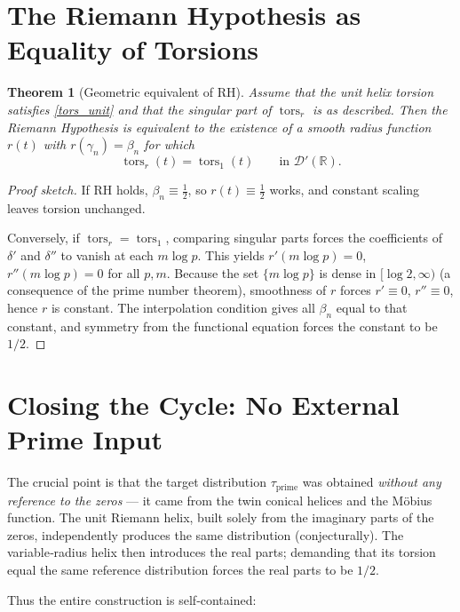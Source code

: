 \documentclass[12pt,a4paper]{article}
\newtheorem{theorem}{Theorem}[section]
\newcommand{\R}{\mathbb{R}}
\newcommand{\dist}{\mathcal{D}'}
\newcommand{\tors}{\operatorname{tors}}
\begin{document}
\section{The Riemann Hypothesis as Equality of Torsions}

\begin{theorem}[Geometric equivalent of RH]\label{thm:RH}
Assume that the unit helix torsion satisfies \eqref{tors_unit} and that the singular part of $\tors_r$ is as described.  Then the Riemann Hypothesis is equivalent to the existence of a smooth radius function $r(t)$ with $r(\gamma_n)=\beta_n$ for which
\[
\tors_r(t) = \tors_1(t) \qquad \text{in } \dist(\R).
\]
\end{theorem}

\begin{proof}[Proof sketch]
If RH holds, $\beta_n\equiv\frac12$, so $r(t)\equiv\frac12$ works, and constant scaling leaves torsion unchanged.

Conversely, if $\tors_r = \tors_1$, comparing singular parts forces the coefficients of $\delta'$ and $\delta''$ to vanish at each $m\log p$.  This yields $r'(m\log p)=0$, $r''(m\log p)=0$ for all $p,m$.  Because the set $\{m\log p\}$ is dense in $[\log 2,\infty)$ (a consequence of the prime number theorem), smoothness of $r$ forces $r'\equiv0$, $r''\equiv0$, hence $r$ is constant.  The interpolation condition gives all $\beta_n$ equal to that constant, and symmetry from the functional equation forces the constant to be $1/2$.
\end{proof}

\section{Closing the Cycle: No External Prime Input}

The crucial point is that the target distribution $\tau_{\text{prime}}$ was obtained \emph{without any reference to the zeros} — it came from the twin conical helices and the M\"obius function.  The unit Riemann helix, built solely from the imaginary parts of the zeros, independently produces the same distribution (conjecturally).  The variable‑radius helix then introduces the real parts; demanding that its torsion equal the same reference distribution forces the real parts to be $1/2$.

Thus the entire construction is self‑contained:
\begin{center}
\end{center}
\end{document}
